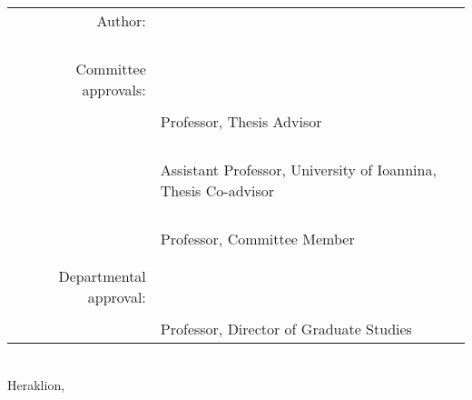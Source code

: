 \begin{titlepage}
\begin{center}
\begin{tabular}{rl}
\\
Author: & \underline{\phantom{123456789012345678901234567890123456789012}}\\
    & \owner{}\\
    \\
    \\
    \\
Committee approvals: & \underline{\phantom{123456789012345678901234567890123456789012}}\\
    & \firstprof{}\\
    & {\small Professor, Thesis Advisor}\\
    \vspace{0.2cm}
    \\
    \\
& \underline{\phantom{123456789012345678901234567890123456789012}}\\
    & \secondprof{}\\
    & {\small Assistant Professor, University of Ioannina, Thesis Co-advisor}\\
    \vspace{0.2cm}
    \\
    \\
& \underline{\phantom{123456789012345678901234567890123456789012}}\\
    & \thirdprof{}\\
    & {\small  Professor, Committee Member}\\
    \vspace{0.2cm}
    \\
    \\
\hspace{1.4ex}Departmental approval: & \underline{\phantom{123456789012345678901234567890123456789012}}\\
    & \chair{}\\
    & {\small  Professor, Director of Graduate Studies}\\
\end{tabular}
\\

\vfill
Heraklion, \thesisdate{}
\end{center}

\thispagestyle{empty}

\end{titlepage}
